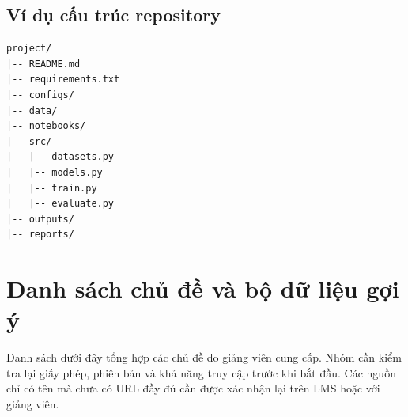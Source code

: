 \documentclass[12pt,a4paper,oneside]{report}
\begin{document}
\section{Ví dụ cấu trúc repository}
\begin{lstlisting}[caption={Cấu trúc thư mục gợi ý}]
project/
|-- README.md
|-- requirements.txt
|-- configs/
|-- data/
|-- notebooks/
|-- src/
|   |-- datasets.py
|   |-- models.py
|   |-- train.py
|   |-- evaluate.py
|-- outputs/
|-- reports/
\end{lstlisting}

\chapter{Danh sách chủ đề và bộ dữ liệu gợi ý}
\begin{instructionbox}
Danh sách dưới đây tổng hợp các chủ đề do giảng viên cung cấp. Nhóm cần kiểm tra lại giấy phép, phiên
bản và khả năng truy cập trước khi bắt đầu. Các nguồn chỉ có tên mà chưa có URL đầy đủ cần được xác
nhận lại trên LMS hoặc với giảng viên.
\end{instructionbox}
\end{document}
